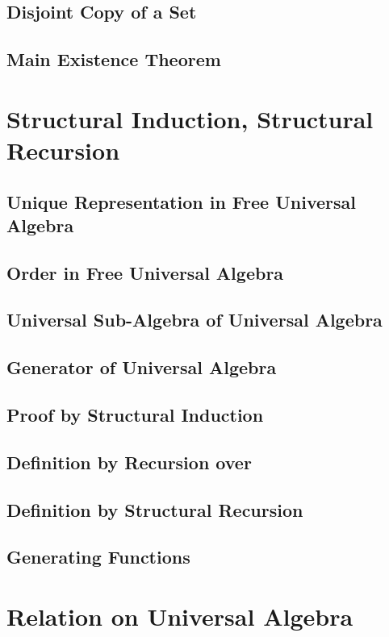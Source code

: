 \documentclass{report}
\begin{document}
    \subsection{Disjoint Copy of a Set}
      
    \subsection{Main Existence Theorem}
      
\section{Structural Induction, Structural Recursion}
    \subsection{Unique Representation in Free Universal Algebra}
      
    \subsection{Order in Free Universal Algebra}
      
    \subsection{Universal Sub-Algebra of Universal Algebra}
      
    \subsection{Generator of Universal Algebra}
      
    \subsection{Proof by Structural Induction}
      
    \subsection{Definition by Recursion over \texorpdfstring{\N}{N}}
      
    \subsection{Definition by Structural Recursion}
      
    \subsection{Generating Functions}
      
\section{Relation on Universal Algebra}
\end{document}
